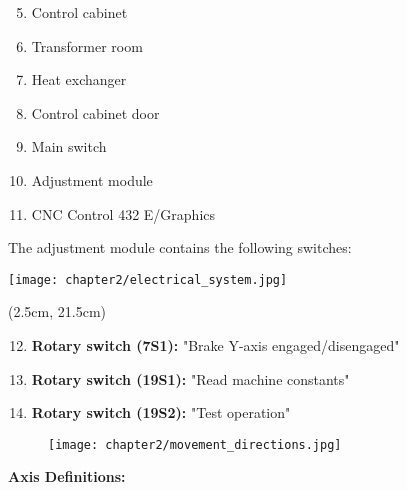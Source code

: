 \begin{minipage}[c]{0.45\textwidth}
    \begin{enumerate}[itemsep=1pt,parsep=0pt]
        \setcounter{enumi}{4}
        \item Control cabinet
        \item Transformer room
        \item Heat exchanger
        \item Control cabinet door
        \item Main switch
        \item Adjustment module
        \item CNC Control 432 E/Graphics
    \end{enumerate}

    The adjustment module contains the following switches:
\end{minipage}%
\begin{minipage}{0.6\textwidth}
    \centering
    \texttt{[image: chapter2/electrical\_system.jpg]}
    \label{fig:electrical_system}
\end{minipage}

\begin{textblock*}{\textwidth}(2.5cm, 21.5cm)  %
    \begin{enumerate}[itemsep=1pt,parsep=0pt]
        \setcounter{enumi}{11}
        \item \textbf{Rotary switch (7S1):} "Brake Y-axis engaged/disengaged"
        \item \textbf{Rotary switch (19S1):} "Read machine constants"
        \item \textbf{Rotary switch (19S2):} "Test operation"
    \end{enumerate}
\end{textblock*}

\vspace{2cm}



\begin{figure}[h]
    \centering
    \texttt{[image: chapter2/movement\_directions.jpg]}
\end{figure}

\vspace{0.5cm}

\textbf{Axis Definitions:}

